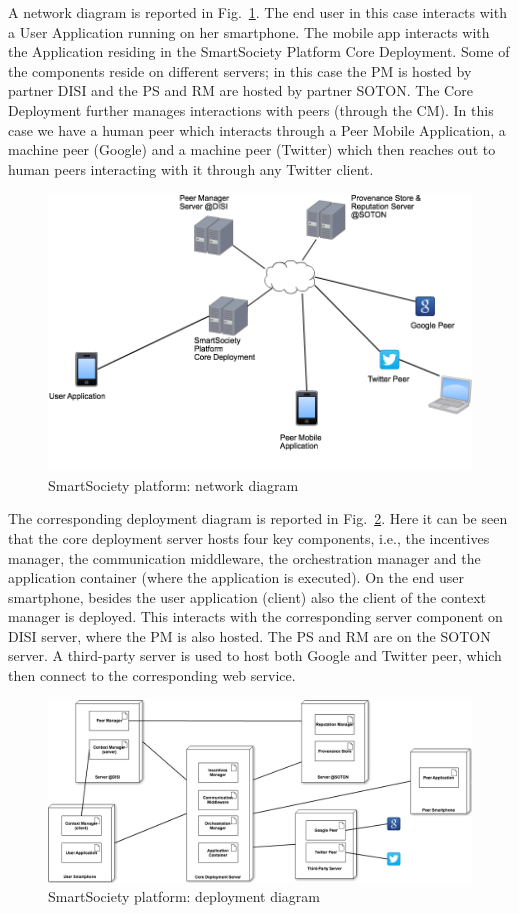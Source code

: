 A network diagram is reported in Fig.~\ref{fig:netDiagram}. The end user in this case interacts with a User Application running on her smartphone. The mobile app interacts with the Application residing in the SmartSociety Platform Core Deployment. Some of the components reside on different servers; in this case the PM is hosted by partner DISI and the PS and RM are hosted by partner SOTON. The Core Deployment further manages interactions with peers (through the CM). In this case we have a human peer which interacts through a Peer Mobile Application, a machine peer (Google) and a machine peer (Twitter) which then reaches out to human peers interacting with it through any Twitter client.

\begin{figure}[!hbt]
 \centering
 \includegraphics[width=1\textwidth]{figs/netDiagram}
 \caption{SmartSociety platform: network diagram}
 \label{fig:netDiagram}
\end{figure}

The corresponding deployment diagram is reported in Fig.~\ref{fig:deployDiagram}. Here it can be seen that the core deployment server hosts four key components, i.e., the incentives manager, the communication middleware, the orchestration manager and the application container (where the application is executed). On the end user smartphone, besides the user application (client) also the client of the context manager is deployed. This interacts with the corresponding server component on DISI server, where the PM is also hosted. The PS and RM are on the SOTON server. A third-party server is used to host both Google and Twitter peer, which then connect to the corresponding web service.
\begin{figure}[!hbt]
 \centering
 \includegraphics[width=1\textwidth]{figs/deploymentView}
 \caption{SmartSociety platform: deployment diagram}
 \label{fig:deployDiagram}
\end{figure}
